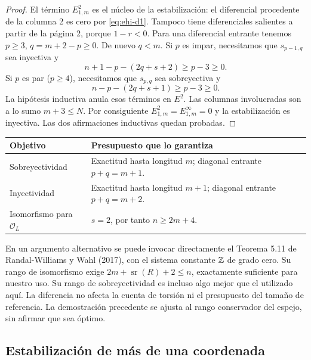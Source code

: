 \begin{proof}
El término $E^2_{1,m}$ es el núcleo de la estabilización: el diferencial procedente de la columna 2 es cero por \eqref{eq:ehi-d1}. Tampoco tiene diferenciales salientes a partir de la página 2, porque $1-r<0$. Para una diferencial entrante tenemos $p\ge3$, $q=m+2-p\ge0$. De nuevo $q<m$. Si $p$ es impar, necesitamos que $s_{p-1,q}$ sea inyectiva y
\begin{equation}
 n+1-p-(2q+s+2)\ge p-3\ge0.
 \label{eq:ehi-inj-odd}
\end{equation}
Si $p$ es par ($p\ge4$), necesitamos que $s_{p,q}$ sea sobreyectiva y
\begin{equation}
 n-p-(2q+s+1)\ge p-3\ge0.
 \label{eq:ehi-inj-even}
\end{equation}
La hipótesis inductiva anula esos términos en $E^2$. Las columnas involucradas son a lo sumo $m+3\le N$. Por consiguiente $E^2_{1,m}=E^\infty_{1,m}=0$ y la estabilización es inyectiva. Las dos afirmaciones inductivas quedan probadas.
\end{proof}

\begin{center}
\small
\begin{tabularx}{\textwidth}{@{}p{}Y@{}}
\toprule
Objetivo & Presupuesto que lo garantiza\\\midrule
Sobreyectividad & Exactitud hasta longitud $m$; diagonal entrante $p+q=m+1$.\\
Inyectividad & Exactitud hasta longitud $m+1$; diagonal entrante $p+q=m+2$.\\
Isomorfismo para $\mathcal O_L$ & $s=2$, por tanto $n\ge2m+4$.\\\bottomrule
\end{tabularx}
\end{center}

\smallskip\noindent En un argumento alternativo se puede invocar directamente el Teorema 5.11 de Randal-Williams y Wahl (2017), con el sistema constante $\mathbb{Z}$ de grado cero. Su rango de isomorfismo exige $2m+\operatorname{sr}(R)+2\le n$, exactamente suficiente para nuestro uso. Su rango de sobreyectividad es incluso algo mejor que el utilizado aquí. La diferencia no afecta la cuenta de torsión ni el presupuesto del tamaño de referencia. La demostración precedente se ajusta al rango conservador del espejo, sin afirmar que sea óptimo.

\subsection{Estabilización de más de una coordenada}

